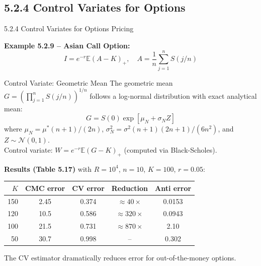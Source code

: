 \documentclass[aspectratio=169,10pt]{beamer}
\begin{document}
\subsection{5.2.4 Control Variates for Options}

\begin{frame}[allowframebreaks]{5.2.4 Control Variates for Options Pricing}

  \textbf{Example 5.2.9 -- Asian Call Option:}
  \[
    I = e^{-r}\mathbb{E}(A - K)_+, \quad A = \frac{1}{n}\sum_{j=1}^n S(j/n)
  \]

  \begin{block}{Control Variate: Geometric Mean}
    The geometric mean $G = \left(\prod_{j=1}^n S(j/n)\right)^{1/n}$
    follows a log-normal distribution with exact analytical mean:
    \[
      G = S(0)\exp\!\left[\mu_N + \sigma_N Z\right]
    \]
    where $\mu_N = \mu^*(n+1)/(2n)$,
    $\sigma_N^2 = \sigma^2(n+1)(2n+1)/(6n^2)$,
    and $Z \sim \mathcal{N}(0,1)$.\\[2pt]
    Control variate: $W = e^{-r}\mathbb{E}(G-K)_+$ (computed via Black-Scholes).
  \end{block}

  \framebreak

  \textbf{Results (Table 5.17)} with $R=10^4$, $n=10$, $K=100$, $r=0.05$:
  \begin{center}
    \small
    \begin{tabular}{rcccc}
      \toprule
      $K$ & CMC error & CV error & Reduction & Anti error \\
      \midrule
      150 & 2.45  & 0.374 & $\approx 40\times$ & 0.0153 \\
      120 & 10.5  & 0.586 & $\approx 320\times$ & 0.0943 \\
      100 & 21.5  & 0.731 & $\approx 870\times$ & 2.10   \\
       50 & 30.7  & 0.998 & -- & 0.302  \\
      \bottomrule
    \end{tabular}
  \end{center}

  The CV estimator dramatically reduces error for out-of-the-money options.

\end{frame}

\end{document}
